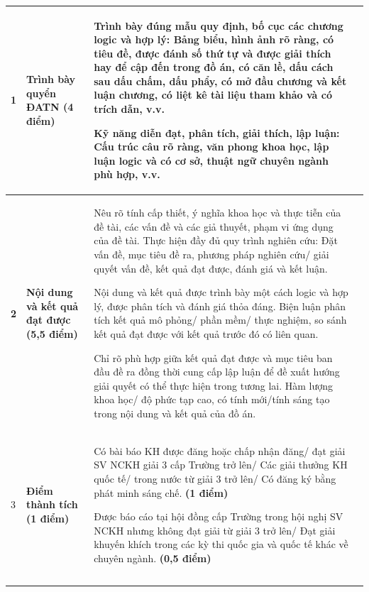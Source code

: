 {\begin{tabular}{|>{\centering\arraybackslash\bfseries}m{0.62cm}%
                  |>{\centering\arraybackslash}m{2.05cm}%
                  |m{12.55cm}%
                  |>{\centering\arraybackslash}m{1.3cm}|}
  1 &
  \textbf{Trình bày quyển ĐATN} \newline\textbf{(4 điểm)} &
  Trình bày đúng mẫu quy định, bố cục các chương logic và hợp lý: Bảng biểu, hình
  ảnh rõ ràng, có tiêu đề, được đánh số thứ tự và được giải thích hay để cập đến
  trong đồ án, có căn lề, dấu cách sau dấu chấm, dấu phẩy, có mở đầu chương và
  kết luận chương, có liệt kê tài liệu tham khảo và có trích dẫn, v.v.

  Kỹ năng diễn đạt, phân tích, giải thích, lập luận: Cấu trúc câu rõ ràng, văn
  phong khoa học, lập luận logic và có cơ sở, thuật ngữ chuyên ngành phù hợp, v.v.
  & \\
  \hline

  2 &
  \textbf{Nội dung và kết quả đạt được} \newline\textbf{(5,5 điểm)} &
  Nêu rõ tính cấp thiết, ý nghĩa khoa học và thực tiễn của đề tài, các vấn đề và
  các giả thuyết, phạm vi ứng dụng của đề tài. Thực hiện đầy đủ quy trình nghiên
  cứu: Đặt vấn đề, mục tiêu đề ra, phương pháp nghiên cứu/ giải quyết vấn đề, kết
  quả đạt được, đánh giá và kết luận.

  Nội dung và kết quả được trình bày một cách logic và hợp lý, được phân tích và
  đánh giá thỏa đáng. Biện luận phân tích kết quả mô phỏng/ phần mềm/ thực
  nghiệm, so sánh kết quả đạt được với kết quả trước đó có liên quan.

  Chỉ rõ phù hợp giữa kết quả đạt được và mục tiêu ban đầu đề ra đồng thời cung
  cấp lập luận để đề xuất hướng giải quyết có thể thực hiện trong tương lai. Hàm
  lượng khoa học/ độ phức tạp cao, có tính mới/tính sáng tạo trong nội dung và
  kết quả của đồ án.
  & \\
  \hline

  3 &
  \textbf{Điểm thành tích} \newline\textbf{(1 điểm)} &
  Có bài báo KH được đăng hoặc chấp nhận đăng/ đạt giải SV NCKH giải 3 cấp
  Trường trở lên/ Các giải thưởng KH quốc tế/ trong nước từ giải 3 trở lên/
  Có đăng ký bằng phát minh sáng chế. \textbf{(1 điểm)}

  Được báo cáo tại hội đồng cấp Trường trong hội nghị SV NCKH nhưng không đạt
  giải từ giải 3 trở lên/ Đạt giải khuyến khích trong các kỳ thi quốc gia và
  quốc tế khác về chuyên ngành. \textbf{(0,5 điểm)}
  & \\
  \hline

  \multicolumn{3}{|r|}{\textbf{Điểm tổng các tiêu chí:}} & \\
  \hline
  \multicolumn{3}{|r|}{\textbf{Điểm phản biện:}} & \\
  \hline
  \end{tabular}

}
